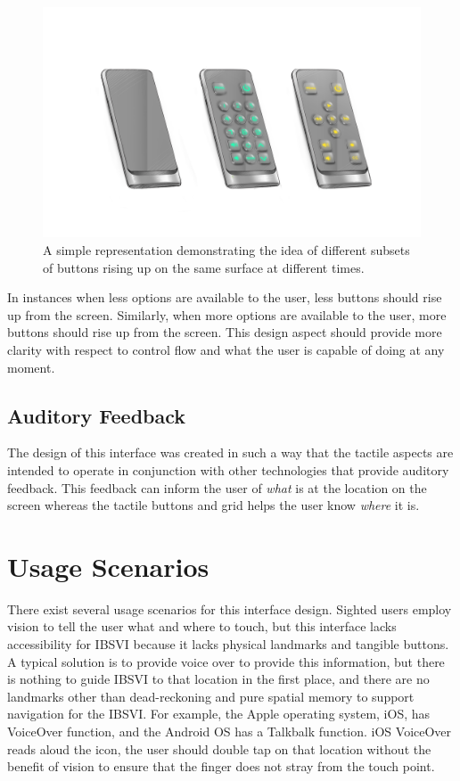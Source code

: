 \documentclass[11pt]{article}
\begin{document}
\begin{figure}[ht]
\centering
\includegraphics[width=6in]{buttons.jpg}
\caption{A simple representation demonstrating the idea of different subsets of buttons rising up on the same surface at different times.}
\label{buttons}
\end{figure}

In instances when less options are available to the user, less buttons should rise up from the screen. Similarly, when more options are available to the user, more buttons should rise up from the screen. This design aspect should provide more clarity with respect to control flow and what the user is capable of doing at any moment.

\subsection{Auditory Feedback}
The design of this interface was created in such a way that the tactile aspects are intended to operate in conjunction with other technologies that provide auditory feedback. This feedback can inform the user of \textit{what} is at the location on the screen whereas the tactile buttons and grid helps the user know \textit{where} it is.


\section{Usage Scenarios}
There exist several usage scenarios for this interface design. Sighted users employ vision to tell the user what and where to touch, but this interface lacks accessibility for IBSVI because it lacks physical landmarks and tangible buttons. A typical solution is to provide voice over to provide this information, but there is nothing to guide IBSVI to that location in the first place, and there are no landmarks other than dead-reckoning and pure spatial memory to support navigation for the IBSVI. For example, the Apple operating system, iOS, has VoiceOver function, and the Android OS has a Talkbalk function. iOS VoiceOver reads aloud the icon, the user should double tap on that location without the benefit of vision to ensure that the finger does not stray from the touch point. 
\end{document}
